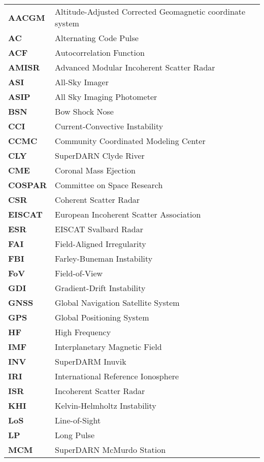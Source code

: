 
\begin{longtable}{ll}
\textbf{AACGM} & Altitude-Adjusted Corrected Geomagnetic coordinate system \\
\textbf{AC} & Alternating Code Pulse \\
\textbf{ACF} & Autocorrelation Function \\
\textbf{AMISR} & Advanced Modular Incoherent Scatter Radar \\
\textbf{ASI} & All-Sky Imager \\
\textbf{ASIP} & All Sky Imaging Photometer \\
\textbf{BSN} & Bow Shock Nose \\
\textbf{CCI} & Current-Convective Instability \\
\textbf{CCMC} & Community Coordinated Modeling Center \\
\textbf{CLY} & SuperDARN Clyde River \\
\textbf{CME} & Coronal Mass Ejection \\
\textbf{COSPAR} & Committee on Space Research \\
\textbf{CSR} & Coherent Scatter Radar \\
\textbf{EISCAT} & European Incoherent Scatter Association \\
\textbf{ESR} & EISCAT Svalbard Radar \\
\textbf{FAI} & Field-Aligned Irregularity \\
\textbf{FBI} & Farley-Buneman Instability \\
\textbf{FoV} & Field-of-View \\
\textbf{GDI} & Gradient-Drift Instability \\
\textbf{GNSS} & Global Navigation Satellite System \\
\textbf{GPS} & Global Positioning System \\
\textbf{HF} & High Frequency \\
\textbf{IMF} & Interplanetary Magnetic Field \\
\textbf{INV} & SuperDARM Inuvik \\
\textbf{IRI} & International Reference Ionosphere \\
\textbf{ISR} & Incoherent Scatter Radar \\
\textbf{KHI} & Kelvin-Helmholtz Instability \\
\textbf{LoS} & Line-of-Sight \\
\textbf{LP} & Long Pulse \\
\textbf{MCM} & SuperDARN McMurdo Station \\

\end{longtable}
